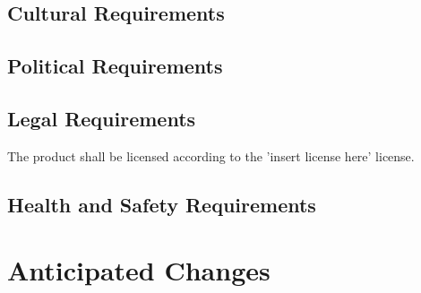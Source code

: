 \documentclass[11pt]{article} %
\begin{document}
\subsection{Cultural Requirements}

\subsection{Political Requirements}

\subsection{Legal Requirements}

The product shall be licensed according to the 'insert license here' %
license.

\subsection{Health and Safety Requirements}


\section{Anticipated Changes}
\end{document}
